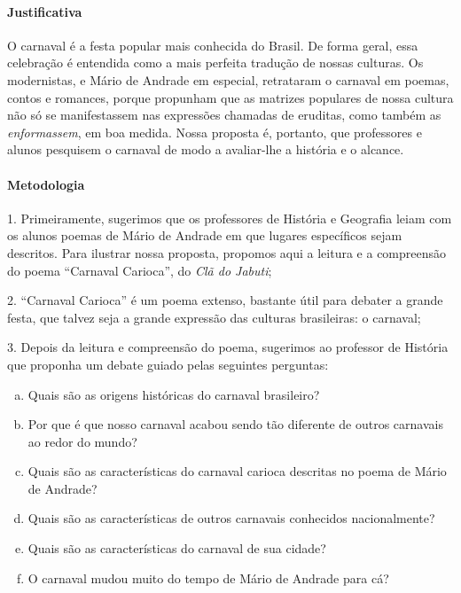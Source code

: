 \documentclass[11pt]{extarticle}
\begin{document}
\paragraph{Justificativa} O carnaval é a festa popular mais conhecida do
Brasil. De forma geral, essa celebração é entendida como a mais perfeita
tradução de nossas culturas. Os modernistas, e Mário de Andrade em
especial, retrataram o carnaval em poemas, contos e romances, porque
propunham que as matrizes populares de nossa cultura não só se
manifestassem nas expressões chamadas de eruditas, como também as
\emph{enformassem}, em boa medida. Nossa proposta é, portanto, que
professores e alunos pesquisem o carnaval de modo a avaliar-lhe a
história e o alcance.

\paragraph{Metodologia}


1. Primeiramente, sugerimos que os professores de História e Geografia
leiam com os alunos poemas de Mário de Andrade em que lugares
específicos sejam descritos. Para ilustrar nossa proposta, propomos aqui
a leitura e a compreensão do poema ``Carnaval Carioca'', do \emph{Clã do
Jabuti};

\vspace{3mm}

2. ``Carnaval Carioca'' é um poema extenso, bastante útil para debater a
grande festa, que talvez seja a grande expressão das culturas
brasileiras: o carnaval;

\vspace{3mm}

3. Depois da leitura e compreensão do poema, sugerimos ao professor de
História que proponha um debate guiado pelas seguintes perguntas:

\begin{enumerate}[(a)]  

\item Quais são as origens históricas do carnaval brasileiro?

\item Por que é que nosso carnaval acabou sendo tão diferente de outros
carnavais ao redor do mundo?

\item Quais são as características do carnaval carioca descritas no poema
de Mário de Andrade?

\item Quais são as características de outros carnavais conhecidos
nacionalmente?

\item Quais são as características do carnaval de sua cidade?

\item O carnaval mudou muito do tempo de Mário de Andrade para cá?

\end{enumerate} 
\end{document}
